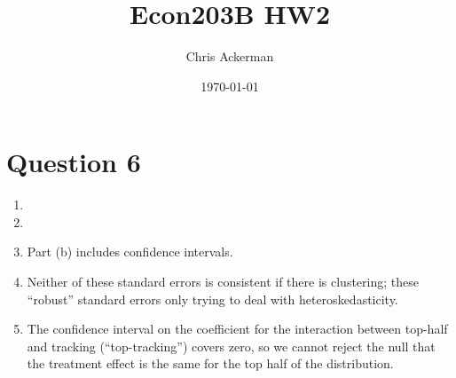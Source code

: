 \documentclass[11pt]{article}
\author{Chris Ackerman}
\date{\today}
\title{Econ203B HW2}
\begin{document}
\maketitle
\tableofcontents

\newpage

\section{Question 6}
\label{sec:orgf402972}

\begin{enumerate}[label=\alph*)]
\item


\item


\item Part (b) includes confidence intervals.
\item Neither of these standard errors is consistent if there is clustering; these ``robust'' standard errors only trying to deal with heteroskedasticity.
\item 
The confidence interval on the coefficient for the interaction between top-half and tracking (``top-tracking'') covers zero, so we cannot reject the null that the treatment effect is the same for the top half of the distribution.
\end{enumerate}
\end{document}
